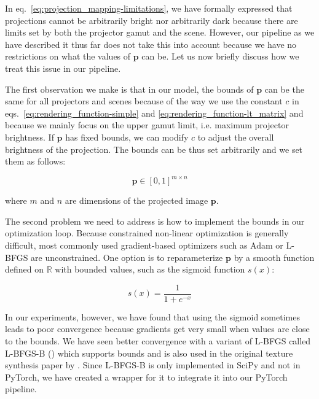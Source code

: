 In eq.~\ref{eq:projection_mapping-limitations}, we have formally expressed that projections cannot be arbitrarily bright nor arbitrarily dark because there are limits set by both the projector gamut and the scene. However, our pipeline as we have described it thus far does not take this into account because we have no restrictions on what the values of \(\bm{p}\) can be. Let us now briefly discuss how we treat this issue in our pipeline.

The first observation we make is that in our model, the bounds of \(\bm{p}\) can be the same for all projectors and scenes because of the way we use the constant \(c\) in eqs.~\ref{eq:rendering_function-simple} and \ref{eq:rendering_function-lt_matrix} and because we mainly focus on the upper gamut limit, i.e. maximum projector brightness. If \(\bm{p}\) has fixed bounds, we can modify \(c\) to adjust the overall brightness of the projection. The bounds can be thus set arbitrarily and we set them as follows:

\begin{equation}
    \label{eq:optimization_restrictions}
    \bm{p} \in [0, 1]^{m \times n}
\end{equation}

where \(m\) and \(n\) are dimensions of the projected image \(\bm{p}\).

The second problem we need to address is how to implement the bounds in our optimization loop. Because constrained non-linear optimization is generally difficult, most commonly used gradient-based optimizers such as Adam or L-BFGS are unconstrained. One option is to reparameterize \(\bm{p}\) by a smooth function defined on \(\mathbb{R}\) with bounded values, such as the sigmoid function \(s(x)\):

\begin{equation}
    \label{eq:sigmoid}
    s(x) = \frac{1}{1 + e^{-x}}
\end{equation}

In our experiments, however, we have found that using the sigmoid sometimes leads to poor convergence because gradients get very small when values are close to the bounds. We have seen better convergence with a variant of L-BFGS called L-BFGS-B (\citet{Byrd1995}) which supports bounds and is also used in the original texture synthesis paper by \citet{Gatys2015}. Since L-BFGS-B is only implemented in SciPy and not in PyTorch, we have created a wrapper for it to integrate it into our PyTorch pipeline.
